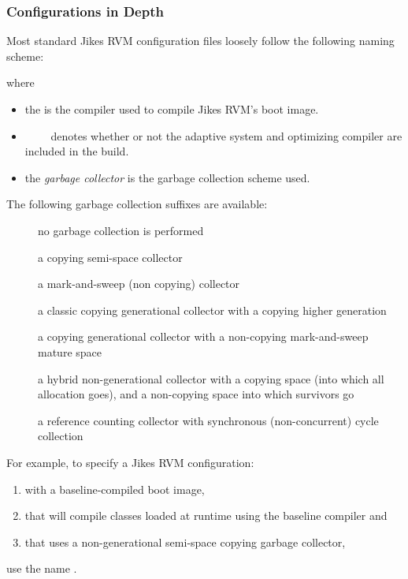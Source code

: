 \subsubsection{Configurations in Depth}

Most standard Jikes RVM configuration files loosely follow the
following naming scheme:
\begin{verse}
       \Mlbr{}  \Mor{}  \Mrbr{}
\end{verse}

%
%
where
\begin{itemize}
\item the  is the compiler used to compile
Jikes RVM's boot image. 
\item
 \Mlbr{}~~\Mor~~\Mrbr{} denotes whether or
 not the adaptive system and optimizing compiler are included in the
 build.  
\item the {\em garbage collector} is the garbage collection scheme used.
\end{itemize}

The following garbage collection suffixes are available:

\begin{description}
\item[] no garbage collection is performed
\item[] a copying semi-space collector
\item[] a mark-and-sweep (non copying) collector
\item[] a classic copying generational collector with a copying
  higher generation
\item[] a copying generational collector with a non-copying
  mark-and-sweep mature space
\item[] a hybrid non-generational collector with a copying space
  (into which all allocation goes), and a non-copying space into which
  survivors go
\item[] a reference counting collector with synchronous
  (non-concurrent) cycle collection
\end{description}

For example, to specify a Jikes RVM configuration: 
\begin{enumerate}
\item with a baseline-compiled boot image,
\item that will compile classes loaded at runtime using the baseline 
compiler and
\item that uses a non-generational semi-space copying garbage
collector, 
\end{enumerate}
use the name .

